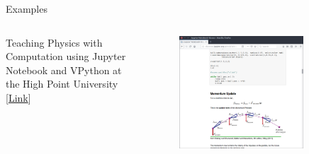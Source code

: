 \documentclass[11pt,t]{beamer}
\begin{document}
\begin{frame}[fragile]{Examples}  

	\begin{columns}[t]
		\begin{column}{.3\textwidth}
		Teaching Physics with Computation
using Jupyter Notebook and VPython at the High Point University [\href{http://nbviewer.jupyter.org/github/atitus/presentations/blob/master/brynmawr-05-19-17/brynmawr-05-19-17.ipynb}{Link}]
	
 
		\end{column}
		\begin{column}{.7\textwidth}
			\vspace{-55pt}
			\begin{figure}
			\centering
			\includegraphics[width=0.80\textwidth]{jupyter_ex_phys}
			
			\end{figure}
		\end{column}
	\end{columns}	
		
\end{frame}
\end{document}
